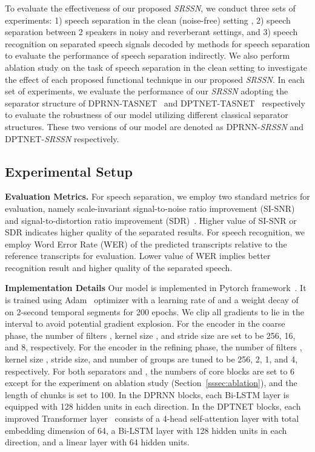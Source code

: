 To evaluate the effectiveness of our proposed \emph{SRSSN}, we conduct three sets of experiments: 1) speech separation in the clean (noise-free) setting , 2) speech separation between 2 speakers in noisy and reverberant settings, and 3) speech recognition on separated speech signals decoded by methods for speech separation to evaluate the performance of speech separation indirectly. We also perform ablation study on the task of speech separation in the clean setting to investigate the effect of each proposed functional technique in our proposed \emph{SRSSN}. In each set of experiments, we evaluate the performance of our \emph{SRSSN} adopting the separator structure of DPRNN-TASNET~\cite{DPRNN} and DPTNET-TASNET~\cite{DPTNet} respectively to evaluate the robustness of our model utilizing different classical separator structures. These two versions of our model are denoted as DPRNN-\emph{SRSSN} and DPTNET-\emph{SRSSN} respectively.

\subsection{Experimental Setup}
\noindent\textbf{Evaluation Metrics.} 
For speech separation, we employ two standard metrics for evaluation, namely scale-invariant signal-to-noise ratio improvement (SI-SNR)~\cite{SISNR} and signal-to-distortion ratio improvement (SDR)~\cite{SDR}. Higher value of SI-SNR or SDR indicates higher quality of the separated results. For speech recognition, we employ Word Error Rate (WER) of the predicted transcripts relative to the reference transcripts for evaluation. Lower value of WER implies better recognition result and higher quality of the separated speech. 

\noindent\textbf{Implementation Details}
Our model is implemented in Pytorch framework~\cite{pytorch}. It is trained using Adam~\cite{adam} optimizer with a learning rate of  and a weight decay of  on 2-second temporal segments for 200 epochs. We clip all gradients to lie in the interval  to avoid potential gradient explosion.
For the encoder  in the coarse phase, the number of filters , kernel size , and stride size are set to be 256, 16, and 8, respectively.
For the encoder  in the refining phase, the number of filters , kernel size , stride size, and number of groups  are tuned to be 256, 2, 1, and 4, respectively. For both separators  and , the numbers of core blocks  are set to 6 except for the experiment on ablation study (Section~\ref{sssec:ablation}), and the length of chunks  is set to 100.
In the DPRNN blocks, each Bi-LSTM layer is equipped with 128 hidden units in each direction. 
In the DPTNET blocks, each improved Transformer layer~\cite{DPTNet} consists of a 4-head self-attention layer with total embedding dimension of 64, a Bi-LSTM layer with 128 hidden units in each direction, and a linear layer with 64 hidden units.



